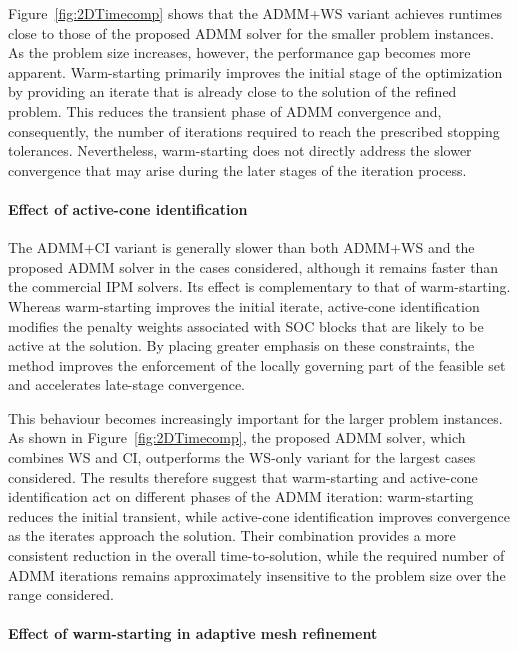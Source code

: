 Figure~\ref{fig:2DTimecomp} shows that the ADMM+WS variant achieves runtimes close to those of the proposed ADMM solver for the smaller problem instances. As the problem size increases, however, the performance gap becomes more apparent. Warm-starting primarily improves the initial stage of the optimization by providing an iterate that is already close to the solution of the refined problem. This reduces the transient phase of ADMM convergence and, consequently, the number of iterations required to reach the prescribed stopping tolerances. Nevertheless, warm-starting does not directly address the slower convergence that may arise during the later stages of the iteration process.

\paragraph{Effect of active-cone identification}

The ADMM+CI variant is generally slower than both ADMM+WS and the proposed ADMM solver in the cases considered, although it remains faster than the commercial IPM solvers. Its effect is complementary to that of warm-starting. Whereas warm-starting improves the initial iterate, active-cone identification modifies the penalty weights associated with SOC blocks that are likely to be active at the solution. By placing greater emphasis on these constraints, the method improves the enforcement of the locally governing part of the feasible set and accelerates late-stage convergence.

This behaviour becomes increasingly important for the larger problem instances. As shown in Figure~\ref{fig:2DTimecomp}, the proposed ADMM solver, which combines WS and CI, outperforms the WS-only variant for the largest cases considered. The results therefore suggest that warm-starting and active-cone identification act on different phases of the ADMM iteration: warm-starting reduces the initial transient, while active-cone identification improves convergence as the iterates approach the solution. Their combination provides a more consistent reduction in the overall time-to-solution, while the required number of ADMM iterations remains approximately insensitive to the problem size over the range considered.

\paragraph{Effect of warm-starting in adaptive mesh refinement}

